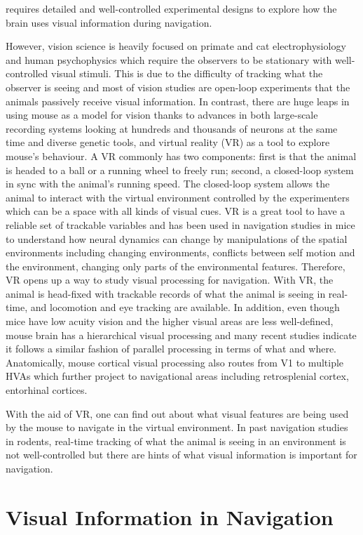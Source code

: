 requires detailed and well-controlled experimental designs to explore how the brain uses visual information during navigation.

However, vision science is heavily focused on primate and cat electrophysiology and human psychophysics which require the observers to be stationary with well-controlled visual stimuli. This is due to the difficulty of tracking what the observer is seeing and most of vision studies are open-loop experiments that the animals passively receive visual information. In contrast, there are huge leaps in using mouse as a model for vision thanks to advances in both large-scale recording systems looking at hundreds and  thousands of neurons at the same time and diverse genetic tools, and virtual reality (VR) as a tool to explore mouse's behaviour. A VR commonly has two components: first is that the animal is headed to a ball or a running wheel to freely run; second, a closed-loop system in sync with the animal's running speed. The closed-loop system allows the animal to interact with the virtual environment controlled by the experimenters which can be a space with all kinds of visual cues. VR is a great tool to have a reliable set of trackable variables and has been used in navigation studies in mice to understand how neural dynamics can change by manipulations of the spatial environments including changing environments, conflicts between self motion and the environment, changing only parts of the environmental features. Therefore, VR opens up a way to study visual processing for navigation. With VR, the animal is head-fixed with trackable records of what the animal is seeing in real-time, and locomotion and eye tracking are available. In addition, even though mice have low acuity vision and the higher visual areas are less well-defined, mouse brain has a hierarchical visual processing and many recent studies indicate it follows a similar fashion of parallel processing in terms of what and where. Anatomically, mouse cortical visual processing also routes from V1 to multiple HVAs which further project to navigational areas including retrosplenial cortex, entorhinal cortices.

With the aid of VR, one can find out about what visual features are being used by the mouse to navigate in the virtual environment. In past navigation studies in rodents, real-time tracking of what the animal is seeing in an environment is not well-controlled but there are hints of what visual information is important for navigation. 


\section{Visual Information in Navigation}

